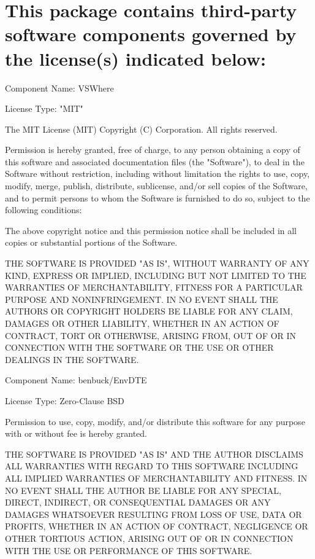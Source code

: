 \chapter{This package contains third-\/party software components governed by the license(s) indicated below\+:}
\hypertarget{md__hey_tea_9_2_library_2_package_cache_2com_8unity_8ide_8visualstudio_0d2_80_820_2_third_party_notices}{}\label{md__hey_tea_9_2_library_2_package_cache_2com_8unity_8ide_8visualstudio_0d2_80_820_2_third_party_notices}
Component Name\+: VSWhere

License Type\+: "{}\+MIT"{}

The MIT License (MIT) Copyright (C)  Corporation. All rights reserved.

Permission is hereby granted, free of charge, to any person obtaining a copy of this software and associated documentation files (the "{}\+Software"{}), to deal in the Software without restriction, including without limitation the rights to use, copy, modify, merge, publish, distribute, sublicense, and/or sell copies of the Software, and to permit persons to whom the Software is furnished to do so, subject to the following conditions\+:

The above copyright notice and this permission notice shall be included in all copies or substantial portions of the Software.

THE SOFTWARE IS PROVIDED "{}\+AS IS"{}, WITHOUT WARRANTY OF ANY KIND, EXPRESS OR IMPLIED, INCLUDING BUT NOT LIMITED TO THE WARRANTIES OF MERCHANTABILITY, FITNESS FOR A PARTICULAR PURPOSE AND NONINFRINGEMENT. IN NO EVENT SHALL THE AUTHORS OR COPYRIGHT HOLDERS BE LIABLE FOR ANY CLAIM, DAMAGES OR OTHER LIABILITY, WHETHER IN AN ACTION OF CONTRACT, TORT OR OTHERWISE, ARISING FROM, OUT OF OR IN CONNECTION WITH THE SOFTWARE OR THE USE OR OTHER DEALINGS IN THE SOFTWARE.

 Component Name\+: benbuck/\+Env\+DTE

License Type\+: Zero-\/\+Clause BSD

Permission to use, copy, modify, and/or distribute this software for any purpose with or without fee is hereby granted.

THE SOFTWARE IS PROVIDED "{}\+AS IS"{} AND THE AUTHOR DISCLAIMS ALL WARRANTIES WITH REGARD TO THIS SOFTWARE INCLUDING ALL IMPLIED WARRANTIES OF MERCHANTABILITY AND FITNESS. IN NO EVENT SHALL THE AUTHOR BE LIABLE FOR ANY SPECIAL, DIRECT, INDIRECT, OR CONSEQUENTIAL DAMAGES OR ANY DAMAGES WHATSOEVER RESULTING FROM LOSS OF USE, DATA OR PROFITS, WHETHER IN AN ACTION OF CONTRACT, NEGLIGENCE OR OTHER TORTIOUS ACTION, ARISING OUT OF OR IN CONNECTION WITH THE USE OR PERFORMANCE OF THIS SOFTWARE. 